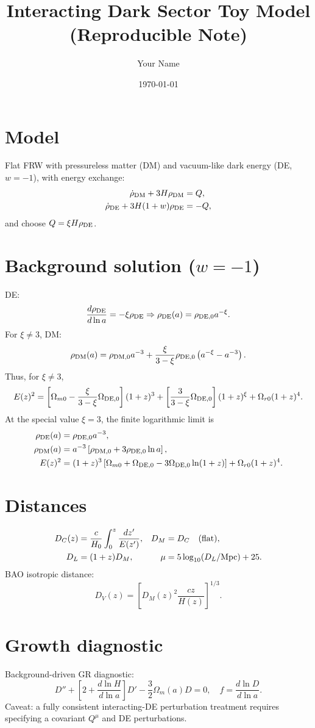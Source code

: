 \documentclass[11pt]{article}
\title{Interacting Dark Sector Toy Model (Reproducible Note)}
\author{Your Name}
\date{\today}
\begin{document}
\maketitle

\section{Model}
Flat FRW with pressureless matter (DM) and vacuum-like dark energy (DE, $w=-1$), with energy exchange:
\begin{align}
\dot\rho_{\rm DM}+3H\rho_{\rm DM} &= Q,\\
\dot\rho_{\rm DE}+3H(1+w)\rho_{\rm DE} &= -Q,
\end{align}
and choose $Q=\xi H\rho_{\rm DE}$.

\section{Background solution (\texorpdfstring{$w=-1$}{w=-1})}
DE:
\[
\frac{d\rho_{\rm DE}}{d\ln a}=-\xi\rho_{\rm DE}\Rightarrow \rho_{\rm DE}(a)=\rho_{{\rm DE},0}a^{-\xi}.
\]
For $\xi\neq3$, DM:
\[
\rho_{\rm DM}(a)=\rho_{{\rm DM},0}a^{-3}+\frac{\xi}{3-\xi}\rho_{{\rm DE},0}\left(a^{-\xi}-a^{-3}\right).
\]
Thus, for $\xi\neq3$,
\[
E(z)^2=\left[\Omega_{m0}-\frac{\xi}{3-\xi}\Omega_{{\rm DE},0}\right](1+z)^3+\left[\frac{3}{3-\xi}\Omega_{{\rm DE},0}\right](1+z)^\xi+\Omega_{r0}(1+z)^4.
\]
At the special value $\xi=3$, the finite logarithmic limit is
\begin{align}
\rho_{\rm DE}(a) &= \rho_{{\rm DE},0}a^{-3},\\
\rho_{\rm DM}(a) &= a^{-3}\left[\rho_{{\rm DM},0}+3\rho_{{\rm DE},0}\ln a\right],\\
E(z)^2 &= (1+z)^3\left[\Omega_{m0}+\Omega_{{\rm DE},0}-3\Omega_{{\rm DE},0}\ln(1+z)\right]
+\Omega_{r0}(1+z)^4.
\end{align}

\section{Distances}
\begin{align*}
D_C(z)&=\frac{c}{H_0}\int_0^z\frac{dz'}{E(z')},
& D_M&=D_C\quad(\text{flat}),\\
D_L&=(1+z)D_M,
& \mu&=5\log_{10}(D_L/{\rm Mpc})+25.
\end{align*}
BAO isotropic distance:
\[
D_V(z)=\left[D_M(z)^2\frac{cz}{H(z)}\right]^{1/3}.
\]

\section{Growth diagnostic}
Background-driven GR diagnostic:
\[
D''+\left[2+\frac{d\ln H}{d\ln a}\right]D'-\frac{3}{2}\Omega_m(a)D=0,\quad f=\frac{d\ln D}{d\ln a}.
\]
Caveat: a fully consistent interacting-DE perturbation treatment requires specifying a covariant $Q^\mu$ and DE perturbations.
\end{document}
